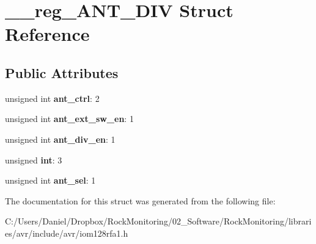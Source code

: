 \hypertarget{struct____reg___a_n_t___d_i_v}{}\section{\+\_\+\+\_\+reg\+\_\+\+A\+N\+T\+\_\+\+D\+IV Struct Reference}
\label{struct____reg___a_n_t___d_i_v}
\subsection*{Public Attributes}
\begin{DoxyCompactItemize}
\item 
unsigned int {\bfseries ant\+\_\+ctrl}\+: 2\hypertarget{struct____reg___a_n_t___d_i_v_ac6e275e9a1b0adadeeff8e6716d97767}{}\label{struct____reg___a_n_t___d_i_v_ac6e275e9a1b0adadeeff8e6716d97767}

\item 
unsigned int {\bfseries ant\+\_\+ext\+\_\+sw\+\_\+en}\+: 1\hypertarget{struct____reg___a_n_t___d_i_v_a8b842ff78d8e87a651ae2d95d89a712c}{}\label{struct____reg___a_n_t___d_i_v_a8b842ff78d8e87a651ae2d95d89a712c}

\item 
unsigned int {\bfseries ant\+\_\+div\+\_\+en}\+: 1\hypertarget{struct____reg___a_n_t___d_i_v_aeda2fb0208e880d5f51d3ed65dbe78c0}{}\label{struct____reg___a_n_t___d_i_v_aeda2fb0208e880d5f51d3ed65dbe78c0}

\item 
unsigned {\bfseries int}\+: 3\hypertarget{struct____reg___a_n_t___d_i_v_ab2833c298048d0a92b7cd0a792df23b7}{}\label{struct____reg___a_n_t___d_i_v_ab2833c298048d0a92b7cd0a792df23b7}

\item 
unsigned int {\bfseries ant\+\_\+sel}\+: 1\hypertarget{struct____reg___a_n_t___d_i_v_acd3f2dfd51fee11c5f244f02e90a1ff3}{}\label{struct____reg___a_n_t___d_i_v_acd3f2dfd51fee11c5f244f02e90a1ff3}

\end{DoxyCompactItemize}


The documentation for this struct was generated from the following file\+:\begin{DoxyCompactItemize}
\item 
C\+:/\+Users/\+Daniel/\+Dropbox/\+Rock\+Monitoring/02\+\_\+\+Software/\+Rock\+Monitoring/libraries/avr/include/avr/iom128rfa1.\+h\end{DoxyCompactItemize}
